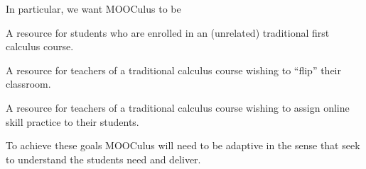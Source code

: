 




 In particular, we want
MOOCulus to be

A resource for students who are enrolled in an (unrelated) traditional first
calculus course.

A resource for teachers of a traditional calculus course wishing to ``flip''
their classroom.

A resource for teachers of a traditional calculus course wishing to assign
online skill practice to their students.

To achieve these goals MOOCulus will need to be adaptive in the sense that
seek to understand the students need and deliver.











